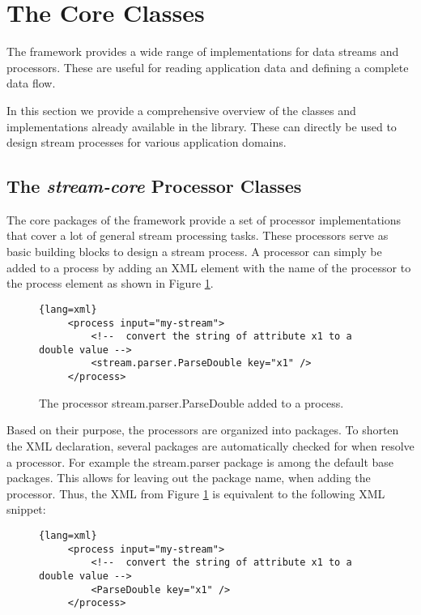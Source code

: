 \section{The \streams Core Classes}
The \streams framework provides a wide range of implementations for
data streams and processors. These are useful for reading application
data and defining a complete data flow.

In this section we provide a comprehensive overview of the classes and
implementations already available in the \streams library. These can
directly be used to design stream processes for various application
domains.



\subsection{The {\em stream-core} Processor Classes}

The core packages of the \streams framework provide a set of processor
implementations that cover a lot of general stream processing
tasks. These processors serve as basic building blocks to design a
stream process. A processor can simply be added to a process by adding
an XML element with the name of the processor to the process element
as shown in Figure \ref{fig:exampleProcessor}.

\begin{figure}[h!]
\centering
\begin{lstlisting}{lang=xml}
     <process input="my-stream">
         <!--  convert the string of attribute x1 to a double value -->
         <stream.parser.ParseDouble key="x1" />
     </process>
\end{lstlisting}
\caption{\label{fig:exampleProcessor}The processor {\ttfamily stream.parser.ParseDouble} added to a process.}
\end{figure}

Based on their purpose, the processors are organized into packages. To
shorten the XML declaration, several packages are automatically
checked for when resolve a processor. For example the {\ttfamily stream.parser} package is among the default base packages. This allows for leaving out the package name, when adding the processor. Thus, the XML from Figure \ref{fig:exampleProcessor} is equivalent to the following XML snippet:
\begin{figure}[h!]
\centering
\begin{lstlisting}{lang=xml}
     <process input="my-stream">
         <!--  convert the string of attribute x1 to a double value -->
         <ParseDouble key="x1" />
     </process>
\end{lstlisting}
\end{figure}


